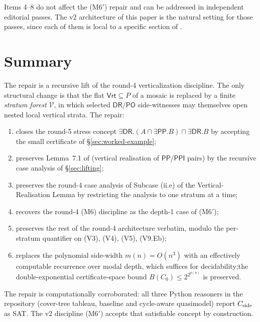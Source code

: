 \documentclass[11pt]{article}
\theoremstyle{definition}
\theoremstyle{remark}
\newcommand{\DR}{\mathsf{DR}}
\newcommand{\PO}{\mathsf{PO}}
\newcommand{\PP}{\mathsf{PP}}
\newcommand{\PPI}{\mathsf{PPI}}
\newcommand{\Vrt}{\mathsf{Vrt}}
\begin{document}
Items 4--8 do not affect the (M6$'$) repair and can be addressed in
independent editorial passes.  The v2 architecture of this paper is
the natural setting for those passes, since each of them is local to
a specific section of \cite{GPT55Repaired}.

\section{Summary}

The repair is a recursive lift of the round-4 verticalization
discipline.  The only structural change is that the flat
$\Vrt\subseteq P$ of a mosaic is replaced by a finite \emph{stratum
forest} $\mathcal V$, in which selected $\DR/\PO$ side-witnesses
may themselves open nested local vertical strata.  The repair:
\begin{enumerate}[label=(\arabic*)]
\item closes the round-5 stress concept
  $\exists\DR.(A\sqcap\exists\PP.B)\sqcap\exists\DR.B$ by accepting
  the small certificate of \S\ref{sec:worked-example};
\item preserves Lemma~7.1 of \cite{GPT55Repaired} (vertical
  realisation of $\PP/\PPI$ pairs) by the recursive case analysis of
  \S\ref{sec:lifting};
\item preserves the round-4 case analysis of Subcase (ii.e) of the
  Vertical-Realisation Lemma by restricting the analysis to one
  stratum at a time;
\item recovers the round-4 (M6) discipline as the depth-1 case of
  (M6$'$);
\item preserves the rest of the round-4 architecture verbatim,
  modulo the per-stratum quantifier on (V3), (V4), (V5), (V9.Eb);
\item replaces the polynomial side-width $m(n)=O(n^3)$ with an
  effectively computable recurrence over modal depth, which suffices
  for decidability;\@ the double-exponential certificate-space bound
  $B(C_0)\leq 2^{2^{p(n)}}$ is preserved.
\end{enumerate}

The repair is computationally corroborated: all three Python
reasoners in the repository (cover-tree tableau, baseline and
cycle-aware quasimodel) report $C_{\rm side}$ as SAT.  The v2
discipline (M6$'$) accepts that satisfiable concept by construction.
\end{document}
